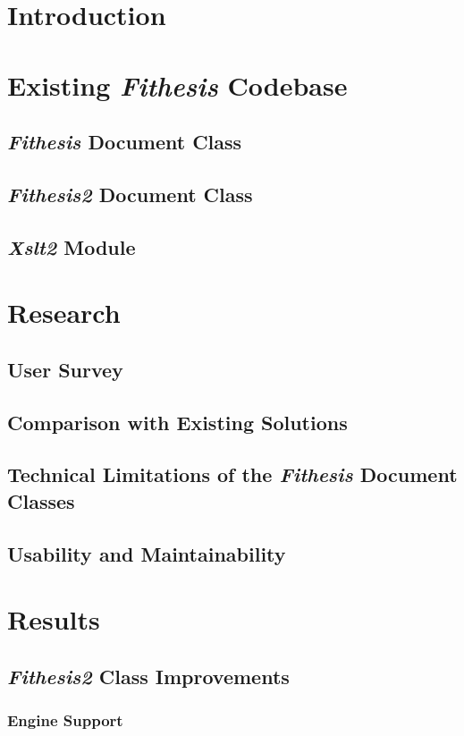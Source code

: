 \documentclass{article}
\begin{document}
  \tableofcontents
  \section{Introduction}
  \section{Existing \emph{Fithesis} Codebase}
  \subsection{\emph{Fithesis} Document Class}
  \subsection{\emph{Fithesis2} Document Class}
  \subsection{\emph{Xslt2} Module}
  \section{Research}
  \subsection{User Survey}
  \subsection{Comparison with Existing Solutions}
  \subsection{Technical Limitations of the \emph{Fithesis} Document Classes}
  \subsection{Usability and Maintainability}
  \section{Results}
  \subsection{\emph{Fithesis2} Class Improvements}
  \subsubsection{\XeLaTeX{} Engine Support}
\end{document}
